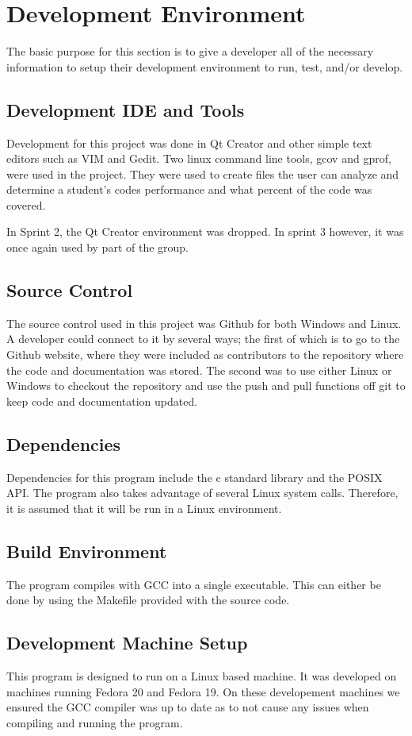 \chapter{Development Environment}
The basic purpose for this section is to give a developer all of the necessary 
information to setup their development environment to run, test, and/or develop.

\section{Development IDE and Tools}
Development for this project was done in Qt Creator and other simple text editors such as VIM and Gedit. 
Two linux command line tools, gcov and gprof, were used in the project. They were used to create files the
user can analyze and determine a student's codes performance and what percent of the code was covered. 

In Sprint 2, the Qt Creator environment was dropped. In sprint 3 however, it was once again used by part 
of the group. 

\section{Source  Control}
The source control used in this project was Github for both Windows and Linux. A developer could connect 
to it by several ways; the first of which is to go to the Github website, where they were included as 
contributors to the repository where the code and documentation was stored. The second was to use either 
Linux or Windows to checkout the repository and use the push and pull functions off git to keep code and 
documentation updated.

\section{Dependencies}
Dependencies for this program include the c standard library and the POSIX API. The program also takes 
advantage of several Linux system calls. Therefore, it is assumed that it will be run in a Linux environment. 

\section{Build  Environment}
The program compiles with GCC into a single executable. This can either be done by using 
the Makefile provided with the source code. 

\section{Development Machine Setup}
This program is designed to run on a Linux based machine.
It was developed on machines running Fedora 20 and Fedora 19. On these developement machines we ensured the 
GCC compiler was up to date as to not cause any issues when compiling and running the program. 

